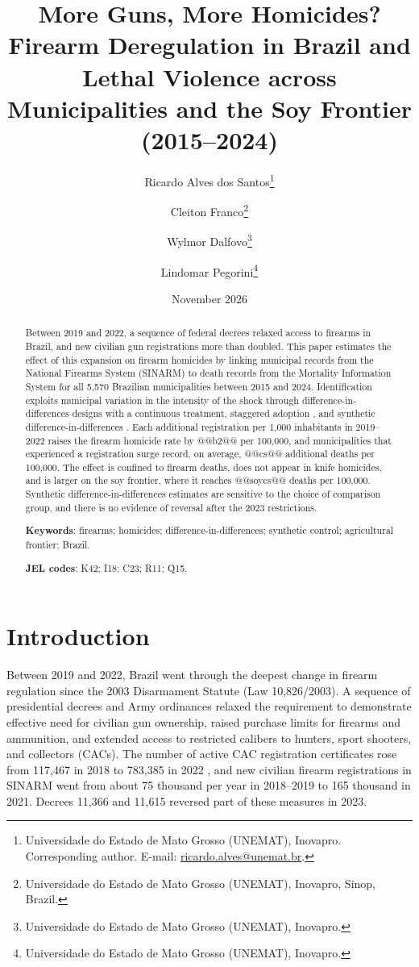 \documentclass[11pt,a4paper]{article}
\title{\textbf{More Guns, More Homicides? Firearm Deregulation in Brazil and Lethal Violence across Municipalities and the Soy Frontier (2015--2024)}}
\author{Ricardo Alves dos Santos\thanks{Universidade do Estado de Mato Grosso (UNEMAT), Inovapro. Corresponding author. E-mail: \href{mailto:ricardo.alves@unemat.br}{ricardo.alves@unemat.br}.}
\and Cleiton Franco\thanks{Universidade do Estado de Mato Grosso (UNEMAT), Inovapro, Sinop, Brazil.}
\and Wylmor Dalfovo\thanks{Universidade do Estado de Mato Grosso (UNEMAT), Inovapro.}
\and Lindomar Pegorini\thanks{Universidade do Estado de Mato Grosso (UNEMAT), Inovapro.}}
\date{November 2026}
\begin{document}
\maketitle
\thispagestyle{empty}

\begin{abstract}
\noindent Between 2019 and 2022, a sequence of federal decrees relaxed access to firearms in Brazil, and new civilian gun registrations more than doubled. This paper estimates the effect of this expansion on firearm homicides by linking municipal records from the National Firearms System (SINARM) to death records from the Mortality Information System for all 5,570 Brazilian municipalities between 2015 and 2024. Identification exploits municipal variation in the intensity of the shock through difference-in-differences designs with a continuous treatment, staggered adoption \citep{callaway2021}, and synthetic difference-in-differences \citep{arkhangelsky2021}. Each additional registration per 1,000 inhabitants in 2019--2022 raises the firearm homicide rate by @@b2@@ per 100,000, and municipalities that experienced a registration surge record, on average, @@cs@@ additional deaths per 100,000. The effect is confined to firearm deaths, does not appear in knife homicides, and is larger on the soy frontier, where it reaches @@soycs@@ deaths per 100,000. Synthetic difference-in-differences estimates are sensitive to the choice of comparison group, and there is no evidence of reversal after the 2023 restrictions.

\vspace{0.6em}
\noindent\textbf{Keywords}: firearms; homicides; difference-in-differences; synthetic control; agricultural frontier; Brazil.

\noindent\textbf{JEL codes}: K42; I18; C23; R11; Q15.
\end{abstract}

\newpage
\setcounter{page}{1}

\section{Introduction}

Between 2019 and 2022, Brazil went through the deepest change in firearm regulation since the 2003 Disarmament Statute (Law 10,826/2003). A sequence of presidential decrees and Army ordinances relaxed the requirement to demonstrate effective need for civilian gun ownership, raised purchase limits for firearms and ammunition, and extended access to restricted calibers to hunters, sport shooters, and collectors (CACs). The number of active CAC registration certificates rose from 117,467 in 2018 to 783,385 in 2022 \citep{fbsp2023}, and new civilian firearm registrations in SINARM went from about 75 thousand per year in 2018--2019 to 165 thousand in 2021. Decrees 11,366 and 11,615 reversed part of these measures in 2023.
\end{document}
